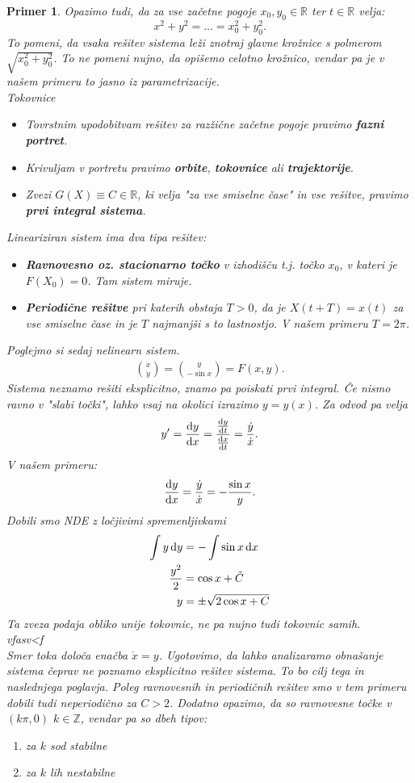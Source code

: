 \documentclass{article}
\newtheorem{primer}{Primer}
\newcommand{\Z}{\mathbb{Z}}
\newcommand{\R}{\mathbb{R}}
\begin{document}
\begin{primer}
Opazimo tudi, da za vse začetne pogoje $x_0, y_0 \in \R$ ter $t\in \R$
velja:
$$
x^2 + y^2 = ... = x_0^2 + y_0^2.
$$
To pomeni, da vsaka rešitev sistema leži znotraj glavne krožnice 
s polmerom $\sqrt{x_0^2 + y_0^2}$. To ne pomeni nujno, da opišemo celotno 
krožnico, vendar pa je v našem primeru to jasno iz parametrizacije.\\
Tokovnice\\
\begin{itemize}
    \item Tovrstnim upodobitvam rešitev za razžične začetne pogoje 
    pravimo \textbf{fazni portret}.
    \item Krivuljam v portretu pravimo \textbf{orbite}, \textbf{tokovnice} ali \textbf{trajektorije}.
    \item Zvezi $G(X) \equiv C\in\R$, ki velja "za vse smiselne čase"
    in vse rešitve, pravimo \textbf{prvi integral sistema}.
\end{itemize}
Lineariziran sistem ima dva tipa rešitev:
\begin{itemize}
    \item \textbf{Ravnovesno oz. stacionarno točko} v izhodišču t.j.
    točko $x_0$, v kateri je $F(X_0) = 0$. Tam sistem miruje.
    \item \textbf{Periodične rešitve} pri katerih obstaja $T>0$, da je 
    $X(t + T) = x(t)$ za vse smiselne čase in je $T$ najmanjši s to lastnostjo. 
    V našem primeru $T = 2\pi$.
\end{itemize}
Poglejmo si sedaj nelinearn sistem.
\begin{align*}
\binom{\dot{x}}{\dot{y}} = \binom{y}{-\sin{x}} = F(x, y).
\end{align*}
Sistema neznamo rešiti eksplicitno, znamo pa poiskati prvi integral.
Če nismo ravno v "slabi točki", lahko vsaj na okolici izrazimo 
$y = y(x)$. Za odvod pa velja 
$$
y' = \frac{\dif y}{\dif x} = \frac{\frac{\dif y}{\dif t}}{\frac{\dif x}{\dif t}} = \frac{\dot{y}}{\dot{x}}.
$$
V našem primeru: 
$$
\frac{\dif y}{\dif x} = \frac{\dot{y}}{\dot{x}} = - \frac{\sin{x}}{y}.
$$
Dobili smo NDE z ločjivimi spremenljivkami
\begin{align*}
\int y \dif y &= - \int \sin{x} \dif x\\
\frac{y^2}{2} &= \cos{x} + \tilde{C} \\
y &= \pm \sqrt{2\cos{x} + C}
\end{align*}
Ta zveza podaja obliko unije tokovnic, ne pa nujno tudi tokovnic samih.\\
vfasv<f\\
Smer toka določa enačba $\dot{x} = y$. Ugotovimo, da lahko analizaramo obnašanje sistema 
čeprav ne poznamo eksplicitno rešitev sistema. To bo cilj tega in naslednjega poglavja.
Poleg ravnovesnih in periodičnih rešitev smo v tem primeru dobili tudi neperiodično 
za $C > 2$. Dodatno opazimo, da so ravnovesne točke v $(k\pi, 0)$
$k\in \Z$, vendar pa so dbeh tipov:
\begin{enumerate}
    \item[->] za $k$ sod stabilne
    \item[->] za $k$ lih nestabilne
\end{enumerate}
\end{primer}
\end{document}
